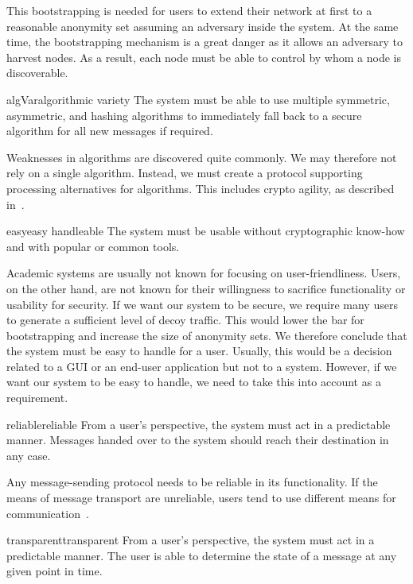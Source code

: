 This bootstrapping is needed for users to extend their network at first to a reasonable anonymity set assuming an adversary inside the system. At the same time, the bootstrapping mechanism is a great danger as it allows an adversary to harvest nodes. As a result, each node must be able to control by whom a node is discoverable.

\begin{requirement}{algVar}{algorithmic variety}
	The system must be able to use multiple symmetric, asymmetric, and hashing algorithms to immediately fall back to a secure algorithm for all new messages if required. 
\end{requirement}

Weaknesses in algorithms are discovered quite commonly. We may therefore not rely on a single algorithm. Instead, we must create a protocol supporting processing alternatives for algorithms. This includes crypto agility, as described in~\cite{bsiPostQuantum}.

\begin{requirement}{easy}{easy handleable}
	The system must be usable without cryptographic know-how and with popular or common tools.
\end{requirement}

Academic systems are usually not known for focusing on user-friendliness. Users, on the other hand, are not known for their willingness to sacrifice functionality or usability for security. If we want our system to be secure, we require many users to generate a sufficient level of decoy traffic. This would lower the bar for bootstrapping and increase the size of anonymity sets. We therefore conclude that the system must be easy to handle for a user. Usually, this would be a decision related to a GUI or an end-user application but not to a system. However, if we want our system to be easy to handle, we need to take this into account as a requirement.

\begin{requirement}{reliable}{reliable}
	From a user's perspective, the system must act in a predictable manner. Messages handed over to the system should reach their destination in any case.
\end{requirement}

Any message-sending protocol needs to be reliable in its functionality. If the means of message transport are unreliable, users tend to use different means for communication~\cite{zhou2011examining}. 

\begin{requirement}{transparent}{transparent}
	From a user's perspective, the system must act in a predictable manner. The user is able to determine the state of a message at any given point in time.
\end{requirement}

